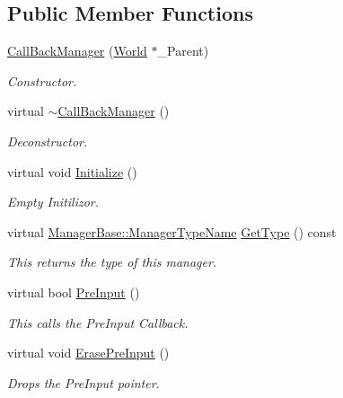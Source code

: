 \subsection*{Public Member Functions}
\begin{DoxyCompactItemize}
\item 
\hyperlink{classphys_1_1CallBackManager_a16d4c60beef774ae904cf01853d71aae}{CallBackManager} (\hyperlink{classphys_1_1World}{World} $\ast$\_\-Parent)
\begin{DoxyCompactList}\small\item\em Constructor. \item\end{DoxyCompactList}\item 
virtual \hyperlink{classphys_1_1CallBackManager_a098b7a7822538aa6d6c4ba690f1e069d}{$\sim$CallBackManager} ()
\begin{DoxyCompactList}\small\item\em Deconstructor. \item\end{DoxyCompactList}\item 
virtual void \hyperlink{classphys_1_1CallBackManager_a3d2af4e3c947b14f628c3e09a96af2f9}{Initialize} ()
\begin{DoxyCompactList}\small\item\em Empty Initilizor. \item\end{DoxyCompactList}\item 
virtual \hyperlink{classphys_1_1ManagerBase_aaa6ccddf23892eaccb898529414f80a5}{ManagerBase::ManagerTypeName} \hyperlink{classphys_1_1CallBackManager_aa0568dd5c2d1bb6dc669dfa2ca3486ad}{GetType} () const 
\begin{DoxyCompactList}\small\item\em This returns the type of this manager. \item\end{DoxyCompactList}\item 
virtual bool \hyperlink{classphys_1_1CallBackManager_a84e782f8729f49b296691763351ee2b1}{PreInput} ()
\begin{DoxyCompactList}\small\item\em This calls the PreInput Callback. \item\end{DoxyCompactList}\item 
virtual void \hyperlink{classphys_1_1CallBackManager_ae3da6f1eb10cdf4d8551aaeeda73053c}{ErasePreInput} ()
\begin{DoxyCompactList}\small\item\em Drops the PreInput pointer. \item\end{DoxyCompactList}\item 

\end{DoxyCompactItemize}
